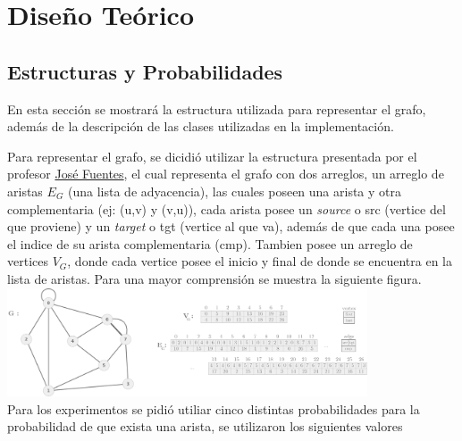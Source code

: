 \documentclass[letterpaper,10pt]{article}
\begin{document}
	

	

	\newpage

	\section{Diseño Teórico}
	
	\subsection{Estructuras y Probabilidades}
    
    En esta sección se mostrará la estructura utilizada para representar el grafo, además de la descripción de las clases utilizadas en la implementación.
	
	Para representar el grafo, se dicidió utilizar la estructura presentada por el profesor \href{https://users.dcc.uchile.cl/~jfuentess/}{José Fuentes}, el cual representa el grafo con dos arreglos, un arreglo de aristas $E_G$ (una lista de adyacencia), las cuales poseen una arista y otra complementaria (ej: (u,v) y (v,u)), cada arista posee un \textit{source} o src (vertice del que proviene) y un \textit{target} o tgt (vertice al que va), además de que cada una posee el indice de su arista complementaria (cmp). Tambien posee un arreglo de vertices $V_G$, donde cada vertice posee el inicio y final de donde se encuentra en la lista de aristas. Para una mayor comprensión se muestra la siguiente figura.\\
	
	
		\includegraphics[width=0.8\textwidth]{figura1.png}
	\\
	
	Para los experimentos se pidió utiliar cinco distintas probabilidades para la probabilidad de que exista una arista, se utilizaron los siguientes valores 
	
\end{document}
